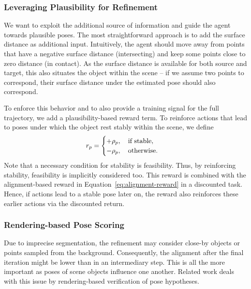 \documentclass[10pt,twocolumn,letterpaper]{article}
\begin{document}
%
\subsubsection{Leveraging Plausibility for Refinement}
We want to exploit the additional source of information and guide the agent towards plausible poses. The most straightforward approach is to add the surface distance as additional input. Intuitively, the agent should move away from points that have a negative surface distance (intersecting) and keep some points close to zero distance (in contact). As the surface distance is available for both source and target, this also situates the object within the scene -- if we assume two points to correspond, their surface distance under the estimated pose should also correspond.

To enforce this behavior and to also provide a training signal for the full trajectory, we add a plausibility-based reward term. To reinforce actions that lead to poses under which the object rest stably within the scene, we define
\begin{equation}
    r_p = \begin{cases}
    +\rho_p, \text{\quad if stable}, \\
    -\rho_p, \text{\quad otherwise}.
    \end{cases}
\end{equation}
Note that a necessary condition for stability is feasibility. Thus, by reinforcing stability, feasibility is implicitly considered too. This reward is combined with the alignment-based reward in Equation~\eqref{eq:alignment-reward} in a discounted task. Hence, if actions lead to a stable pose later on, the reward also reinforces these earlier actions via the discounted return.

\subsubsection{Rendering-based Pose Scoring}
Due to imprecise segmentation, the refinement may consider close-by objects or points sampled from the background. Consequently, the alignment after the final iteration might be lower than in an intermediary step. This is all the more important as poses of scene objects influence one another. Related work \cite{deng2021poserbpf,bauer2020verefine} deals with this issue by rendering-based verification of pose hypotheses.
\end{document}
